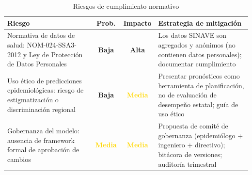 \documentclass[12pt, letterpaper]{article}
\newcommand{\riskHigh}{\cellcolor{lightred}\textbf{\textcolor{burgundy}{Alta}}}
\newcommand{\riskMed}{\cellcolor{lightyellow}\textbf{\textcolor{gold}{Media}}}
\newcommand{\riskLow}{\cellcolor{lightgreen}\textbf{\textcolor{darkteal}{Baja}}}
\begin{document}
\begin{table}[H]
\centering
\caption{Riesgos de cumplimiento normativo}
\label{tab:riesgos_cumplimiento}
\scriptsize
\setlength{\tabcolsep}{3pt}
\begin{tabularx}{\textwidth}{>{\raggedright\arraybackslash}X c c >{\raggedright\arraybackslash}X}
\toprule
\textbf{Riesgo} & \textbf{Prob.} & \textbf{Impacto} & \textbf{Estrategia de mitigación} \\
\midrule
Normativa de datos de salud: NOM-024-SSA3-2012 y Ley de Protección de Datos Personales & \riskLow & \riskHigh & Los datos SINAVE son agregados y anónimos (no contienen datos personales); documentar cumplimiento \\
\addlinespace
Uso ético de predicciones epidemiológicas: riesgo de estigmatización o discriminación regional & \riskLow & \riskMed & Presentar pronósticos como herramienta de planificación, no de evaluación de desempeño estatal; guía de uso ético \\
\addlinespace
Gobernanza del modelo: ausencia de framework formal de aprobación de cambios & \riskMed & \riskMed & Propuesta de comité de gobernanza (epidemiólogo + ingeniero + directivo); bitácora de versiones; auditoría trimestral \\
\bottomrule
\end{tabularx}
\end{table}
\end{document}
